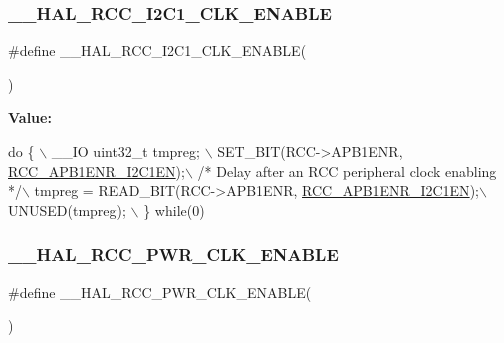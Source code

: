 \subsubsection{\texorpdfstring{\+\_\+\+\_\+\+H\+A\+L\+\_\+\+R\+C\+C\+\_\+\+I2\+C1\+\_\+\+C\+L\+K\+\_\+\+E\+N\+A\+B\+LE}{\_\_HAL\_RCC\_I2C1\_CLK\_ENABLE}}
{\footnotesize\ttfamily \#define \+\_\+\+\_\+\+H\+A\+L\+\_\+\+R\+C\+C\+\_\+\+I2\+C1\+\_\+\+C\+L\+K\+\_\+\+E\+N\+A\+B\+LE(\begin{DoxyParamCaption}{ }\end{DoxyParamCaption})}

{\bfseries Value\+:}
\begin{DoxyCode}
\textcolor{keywordflow}{do} \{ \(\backslash\)
                                        \_\_IO uint32\_t tmpreg; \(\backslash\)
                                        SET\_BIT(RCC->APB1ENR, \hyperlink{group___peripheral___registers___bits___definition_ga5ca3afe0c517702b2d1366b692c8db0e}{RCC\_APB1ENR\_I2C1EN});\(\backslash\)
                                        \textcolor{comment}{/* Delay after an RCC peripheral clock enabling */}\(\backslash\)
                                        tmpreg = READ\_BIT(RCC->APB1ENR, 
      \hyperlink{group___peripheral___registers___bits___definition_ga5ca3afe0c517702b2d1366b692c8db0e}{RCC\_APB1ENR\_I2C1EN});\(\backslash\)
                                        UNUSED(tmpreg); \(\backslash\)
                                      \} \textcolor{keywordflow}{while}(0)
\end{DoxyCode}
\mbox{\label{group___r_c_c___a_p_b1___clock___enable___disable_ga6c7399cc977622172aeda52a86ceed92}} 
\subsubsection{\texorpdfstring{\+\_\+\+\_\+\+H\+A\+L\+\_\+\+R\+C\+C\+\_\+\+P\+W\+R\+\_\+\+C\+L\+K\+\_\+\+E\+N\+A\+B\+LE}{\_\_HAL\_RCC\_PWR\_CLK\_ENABLE}}
{\footnotesize\ttfamily \#define \+\_\+\+\_\+\+H\+A\+L\+\_\+\+R\+C\+C\+\_\+\+P\+W\+R\+\_\+\+C\+L\+K\+\_\+\+E\+N\+A\+B\+LE(\begin{DoxyParamCaption}{ }\end{DoxyParamCaption})}

